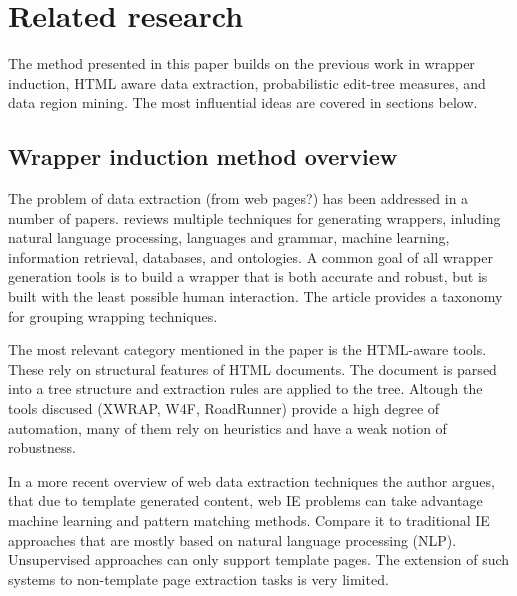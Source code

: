 \chapter{Related research}




The method presented in this paper builds on the previous work in wrapper induction, HTML aware data extraction, probabilistic edit-tree measures, and data region mining. The most influential ideas are covered in sections below.


\section{Wrapper induction method overview}

The problem of data extraction (from web pages?) has been addressed in a number of papers. \cite{Laender:2002:BSW:565117.565137} reviews multiple techniques for generating wrappers, inluding natural language processing, languages and grammar, machine learning, information retrieval, databases, and ontologies. A common goal of all wrapper generation tools is to build a wrapper that is both accurate and robust, but is built with the least possible human interaction. The article provides a taxonomy for grouping wrapping techniques.

The most relevant category mentioned in the paper is the HTML-aware tools. These rely on structural features of HTML documents. The document is parsed into a tree structure and extraction rules are applied to the tree. Altough the tools discused (XWRAP, W4F, RoadRunner) provide a high degree of automation, many of them rely on heuristics and have a weak notion of robustness.

In a more recent overview of web data extraction techniques \cite{Chang:2006:SWI:1159162.1159300} the author argues, that due to template generated content, web IE problems can take advantage machine learning and pattern matching methods. Compare it to traditional IE approaches that are mostly based on natural language processing (NLP). Unsupervised approaches can only support template pages. The extension of such systems to non-template page extraction tasks is very limited.

